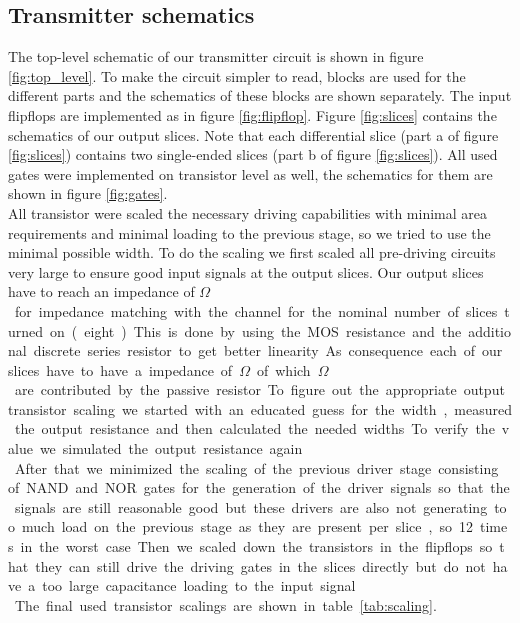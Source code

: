\subsection{Transmitter schematics}

The top-level schematic of our transmitter circuit is shown in figure \ref{fig:top_level}. To make the circuit simpler to read, blocks are used for the different parts and the schematics of these blocks are shown separately. The input flipflops are implemented as in figure \ref{fig:flipflop}. Figure \ref{fig:slices} contains the schematics of our output slices. Note that each differential slice (part a of figure \ref{fig:slices}) contains two single-ended slices (part b of figure \ref{fig:slices}). All used gates were implemented on transistor level as well, the schematics for them are shown in figure \ref{fig:gates}.\\
All transistor were scaled the necessary driving capabilities with minimal area requirements and minimal loading to the previous stage, so we tried to use the minimal possible width. To do the scaling we first scaled all pre-driving circuits very large to ensure good input signals at the output slices. Our output slices have to reach an impedance of \unit[50]{$\Omega$} for impedance matching with the channel for the nominal number of slices turned on (eight). This is done by using the MOS resistance and the additional discrete series resistor to get better linearity. As consequence each of our slices have to have a impedance of \unit[400]{$\Omega$} of which \unit[300]{$\Omega$} are contributed by the passive resistor. To figure out the appropriate output transistor scaling we started with an educated guess for the width, measured the output resistance and then calculated the needed widths. To verify the value we simulated the output resistance again.\\
After that we minimized the scaling of the previous driver stage consisting of NAND and NOR gates for the generation of the driver signals so that the signals are still reasonable good but these drivers are also not generating too much load on the previous stage as they are present per slice, so 12 times in the worst case. Then we scaled down the transistors in the flipflops so that they can still drive the driving gates in the slices directly but do not have a too large capacitance loading to the input signal.\\
The final used transistor scalings are shown in table \ref{tab:scaling}.

